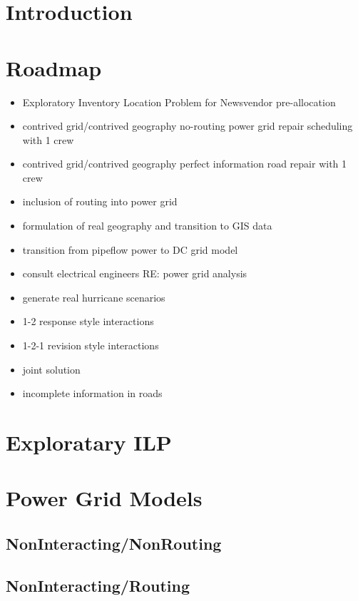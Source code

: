 \documentclass{article}
\begin{document}
	\section{Introduction}
	\section{Roadmap}
	\begin{itemize}
		\item Exploratory Inventory Location Problem for Newsvendor pre-allocation
		\item contrived grid/contrived geography no-routing power grid repair scheduling with 1 crew
		\item contrived grid/contrived geography perfect information road repair with 1 crew
		\item inclusion of routing into power grid
		\item formulation of real geography and transition to GIS data
		\item transition from pipeflow power to DC grid model
		\item consult electrical engineers RE: power grid analysis
		\item generate real hurricane scenarios
		\item 1-2 response style interactions
		\item 1-2-1 revision style interactions
		\item joint solution
		\item incomplete information in roads
		
	\end{itemize}
	\section{Exploratary ILP}
	\section{Power Grid Models}
	\subsection{NonInteracting/NonRouting}
	\subsection{NonInteracting/Routing}
\end{document}
